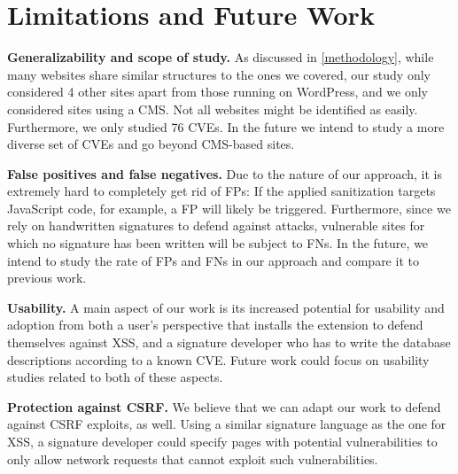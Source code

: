 \section{Limitations and Future Work}

\textbf{Generalizability and scope of study.} As discussed in \autoref{methodology}, while many websites share similar structures to the ones we covered, our study only considered 4 other sites apart from those running on WordPress, and we only considered sites using a CMS. Not all websites might be identified as easily. Furthermore, we only studied 76 CVEs. %
In the future we intend to study a more diverse set of CVEs and go beyond CMS-based sites.

\textbf{False positives and false negatives.} Due to the nature of our approach, it is extremely hard to completely get rid of FPs: If the applied sanitization targets JavaScript code, for example, a FP will likely be triggered. Furthermore, since we rely on handwritten signatures to defend against attacks, vulnerable sites for which no signature has been written will be subject to FNs. In the future, we intend to study the rate of FPs and FNs in our approach and compare it to previous work.


\textbf{Usability.} A main aspect of our work is its increased potential for usability and adoption from both a user's perspective that installs the extension to defend themselves against \ac{XSS}, and a signature developer who has to write the database descriptions according to a known CVE. Future work could focus on usability studies related to both of these aspects.

\textbf{Protection against CSRF.} We believe that we can adapt our work to defend against \ac{CSRF} exploits, as well. Using a similar signature language as the one for \ac{XSS}, a signature developer could specify pages with potential vulnerabilities to only allow network requests that cannot exploit such vulnerabilities.

